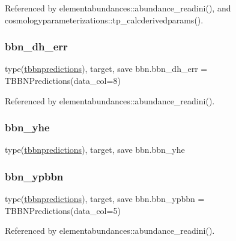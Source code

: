 Referenced by elementabundances\+::abundance\+\_\+readini(), and cosmologyparameterizations\+::tp\+\_\+calcderivedparams().

\mbox{\label{namespacebbn_af20311a952d5520b6e4f5a44795175a3}} 
\subsubsection{\texorpdfstring{bbn\+\_\+dh\+\_\+err}{bbn\_dh\_err}}
{\footnotesize\ttfamily type(\mbox{\hyperlink{structbbn_1_1tbbnpredictions}{tbbnpredictions}}), target, save bbn.\+bbn\+\_\+dh\+\_\+err = T\+B\+B\+N\+Predictions(data\+\_\+col=8)}



Referenced by elementabundances\+::abundance\+\_\+readini().

\mbox{\label{namespacebbn_a32b631b9e3dda13eb68cc107abe6b861}} 
\subsubsection{\texorpdfstring{bbn\+\_\+yhe}{bbn\_yhe}}
{\footnotesize\ttfamily type(\mbox{\hyperlink{structbbn_1_1tbbnpredictions}{tbbnpredictions}}), target, save bbn.\+bbn\+\_\+yhe}

\mbox{\label{namespacebbn_a4f282765adaec1cd6e128f858dbc245b}} 
\subsubsection{\texorpdfstring{bbn\+\_\+ypbbn}{bbn\_ypbbn}}
{\footnotesize\ttfamily type(\mbox{\hyperlink{structbbn_1_1tbbnpredictions}{tbbnpredictions}}), target, save bbn.\+bbn\+\_\+ypbbn = T\+B\+B\+N\+Predictions(data\+\_\+col=5)}



Referenced by elementabundances\+::abundance\+\_\+readini().

\mbox{\label{namespacebbn_a21e11bb5000d0be2b824a94078d295a1}} 

